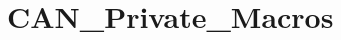 \hypertarget{group___c_a_n___private___macros}{\section{C\-A\-N\-\_\-\-Private\-\_\-\-Macros}
\label{group___c_a_n___private___macros}
}
